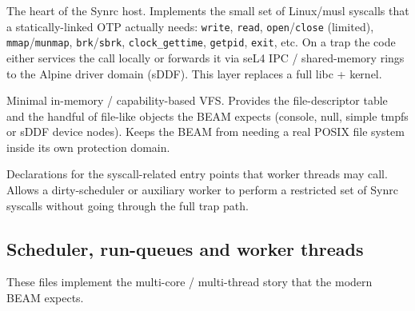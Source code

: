 \documentclass{article}
\begin{document}
\begin{description}[style=nextline]
  \item[\texttt{syscall\_trap.h} / \texttt{syscall\_trap.c}]
    The heart of the Synrc host.
    Implements the small set of Linux/musl syscalls that a statically-linked OTP actually needs: \texttt{write}, \texttt{read}, \texttt{open}/\texttt{close} (limited), \texttt{mmap}/\texttt{munmap}, \texttt{brk}/\texttt{sbrk}, \texttt{clock\_gettime}, \texttt{getpid}, \texttt{exit}, etc.
    On a trap the code either services the call locally or forwards it via seL4 IPC / shared-memory rings to the Alpine driver domain (sDDF).
    This layer replaces a full libc + kernel.

  \item[\texttt{vfs.h} / \texttt{vfs.c}]
    Minimal in-memory / capability-based VFS.
    Provides the file-descriptor table and the handful of file-like objects the BEAM expects (console, null, simple tmpfs or sDDF device nodes).
    Keeps the BEAM from needing a real POSIX file system inside its own protection domain.

  \item[\texttt{worker\_syscall.h}]
    Declarations for the syscall-related entry points that worker threads may call.
    Allows a dirty-scheduler or auxiliary worker to perform a restricted set of Synrc syscalls without going through the full trap path.
\end{description}

\subsection{Scheduler, run-queues and worker threads}

These files implement the multi-core / multi-thread story that the modern BEAM expects.
\end{document}
